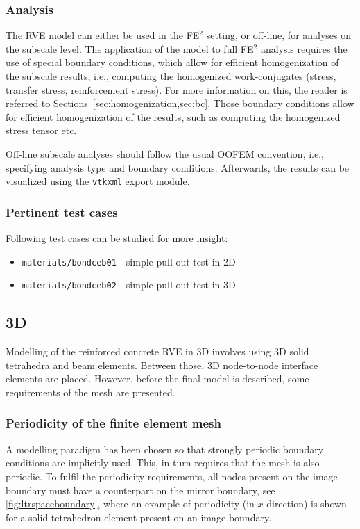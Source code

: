\documentclass[11pt]{article}
\begin{document}
\subsubsection{Analysis}
The RVE model can either be used in the FE$^2$ setting, or off-line, for analyses on the subscale level. The application of the model to full FE$^2$ analysis requires the use of special boundary conditions, which allow for efficient homogenization of the subscale results, i.e., computing the homogenized work-conjugates (stress, transfer stress, reinforcement stress). For more information on this, the reader is referred to Sections~\cref{sec:homogenization,sec:bc}. Those boundary conditions allow for efficient homogenization of the results, such as computing the homogenized stress tensor etc. 

Off-line subscale analyses should follow the usual OOFEM convention, i.e., specifying analysis type and boundary conditions. Afterwards, the results can be visualized using the \texttt{vtkxml} export module.

\subsubsection{Pertinent test cases}

Following test cases can be studied for more insight: 

\begin{itemize}
    \item \texttt{materials/bondceb01} - simple pull-out test in 2D
    \item \texttt{materials/bondceb02} - simple pull-out test in 3D
\end{itemize}

\subsection{3D}
\label{sec:3d}

Modelling of the reinforced concrete RVE in 3D involves using 3D solid tetrahedra and beam elements. Between those, 3D node-to-node interface elements are placed. 
However, before the final model is described, some requirements of the mesh are presented.

\subsubsection{Periodicity of the finite element mesh}
A modelling paradigm has been chosen so that strongly periodic boundary conditions are implicitly used. 
This, in turn requires that the mesh is also periodic.
To fulfil the periodicity requirements, all nodes present on the image boundary must have a counterpart on the mirror boundary, see \cref{fig:ltrspaceboundary}, where an example of periodicity (in $x$-direction) is shown for a solid tetrahedron element present on an image boundary.
\end{document}
